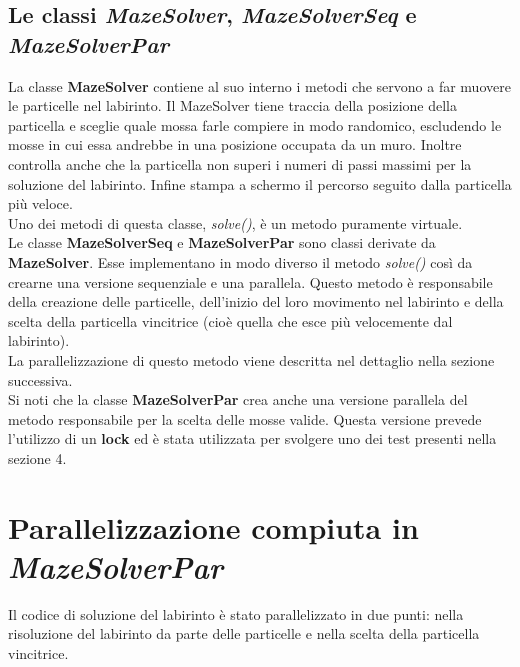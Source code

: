 \documentclass[10pt,twocolumn,letterpaper]{article}
\begin{document}
\subsection{Le classi \textit{MazeSolver}, \textit{MazeSolverSeq} e \textit{MazeSolverPar}}
La classe \textbf{MazeSolver} contiene al suo interno i metodi che servono a far muovere le particelle nel labirinto. Il MazeSolver tiene traccia della posizione della particella e sceglie quale mossa farle compiere in modo randomico, escludendo le mosse in cui essa andrebbe in una posizione occupata da un muro. Inoltre controlla anche che la particella non superi i numeri di passi massimi per la soluzione del labirinto. Infine stampa a schermo il percorso seguito dalla particella più veloce.\\
Uno dei metodi di questa classe, \textit{solve()}, è un metodo puramente virtuale.\\
Le classe \textbf{MazeSolverSeq} e \textbf{MazeSolverPar} sono classi derivate da \textbf{MazeSolver}. Esse implementano in modo diverso il metodo \textit{solve()} così da crearne una versione sequenziale e una parallela. Questo metodo è responsabile della creazione delle particelle, dell'inizio del loro movimento nel labirinto e della scelta della particella vincitrice (cioè quella che esce più velocemente dal labirinto).\\
La parallelizzazione di questo metodo viene descritta nel dettaglio nella sezione successiva.\\
Si noti che la classe \textbf{MazeSolverPar} crea anche una versione parallela del metodo responsabile per la scelta delle mosse valide. Questa versione prevede l'utilizzo di un \textbf{lock} ed è stata utilizzata per svolgere uno dei test presenti nella sezione 4.

\section{Parallelizzazione compiuta in \textit{MazeSolverPar}}
Il codice di soluzione del labirinto è stato parallelizzato in due punti: nella risoluzione del labirinto da parte delle particelle e nella scelta della particella vincitrice.
\end{document}
